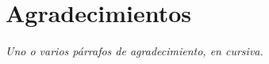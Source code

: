 \section*{Agradecimientos}

\begin{shaded}
\textit{Uno o varios párrafos de agradecimiento, en cursiva.}
\end{shaded}